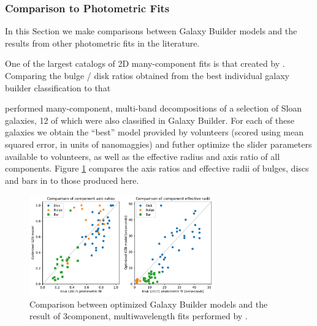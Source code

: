 \documentclass[../main.tex]{subfiles}
\begin{document}



\subsubsection{Comparison to Photometric Fits}
In this Section we make comparisons between Galaxy Builder models and the results from other photometric fits in the literature.

One of the largest catalogs of 2D many-component fits is that created by \citet{Simard2011:1107.1518v1}. Comparing the bulge / disk ratios obtained from the best individual galaxy builder classification to that

\citet{Kruk2017:1710.00093v2} performed many-component, multi-band decompositions of a selection of Sloan galaxies, 12 of which were also classified in Galaxy Builder. For each of these galaxies we obtain the ``best'' model provided by volunteers (scored using mean squared error, in units of nanomaggies) and futher optimize the slider parameters available to volunteers, as well as the effective radius and axis ratio of all components. Figure \ref{fig:sd_comp_comparison} compares the axis ratios and effective radii of bulges, discs and bars in \citet{Kruk2017:1710.00093v2} to those produced here.

\begin{figure}
  \includegraphics[width=8cm]{images__results/sd_comp_comparison.pdf}
  \caption{Comparison between optimized Galaxy Builder models and the result of 3\-component, multi\-wavelength fits performed by \citet{Kruk2017:1710.00093v2}.}
  \label{fig:sd_comp_comparison}
\end{figure}
\end{document}
